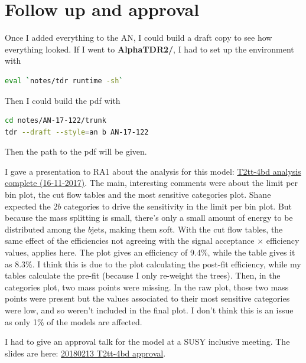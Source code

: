 

\section{Follow up and approval}

Once I added everything to the AN, I could build a draft copy to see how everything looked. If I went to \textbf{AlphaTDR2/}, I had to set up the environment with

\begin{lstlisting}[belowskip=-0.7cm, language=sh, numbers=none]
eval `notes/tdr runtime -sh`
\end{lstlisting}

Then I could build the pdf with

\begin{lstlisting}[belowskip=-0.7cm, language=sh, numbers=none]
cd notes/AN-17-122/trunk
tdr --draft --style=an b AN-17-122
\end{lstlisting}

Then the path to the pdf will be given.

I gave a presentation to RA1 about the analysis for this model: \href{run:./sec31/T2tt-4bd analysis complete (16-11-2017).pdf}{T2tt-4bd analysis complete (16-11-2017)}. The main, interesting comments were about the limit per bin plot, the cut flow tables and the most sensitive \njet categories plot. Shane expected the $2b$ categories to drive the sensitivity in the limit per bin plot. But because the mass splitting is small, there's only a small amount of energy to be distributed among the $b$jets, making them soft. With the cut flow tables, the same effect of the efficiencies not agreeing with the signal acceptance $\times$ efficiency values, applies here. The plot gives an efficiency of 9.4\%, while the table gives it as 8.3\%. I think this is due to the plot calculating the post-fit efficiency, while my tables calculate the pre-fit (because I only re-weight the trees). Then, in the \njet categories plot, two mass points were missing. In the raw plot, those two mass points were present but the values associated to their most sensitive categories were low, and so weren't included in the final plot. I don't think this is an issue as only 1\% of the models are affected.

I had to give an approval talk for the model at a SUSY inclusive meeting. The slides are here: \href{run:./sec31/T20180213 T2tt-4bd approval.pdf}{20180213 T2tt-4bd approval}.


